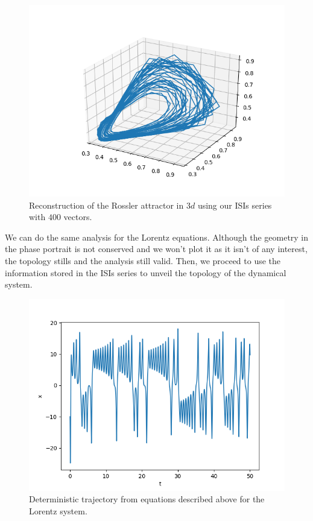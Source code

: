 \documentclass[10pt]{article}
\begin{document}
\begin{figure}[h!]
\centering
\includegraphics[scale=0.45]{rossler_atractor_400points}
\caption{Reconstruction of the Rossler attractor in $3d$ using our ISIs series with $400$ vectors.}
\label{fig:rossler_isi}
\end{figure}

We can do the same analysis for the Lorentz equations. Although the geometry in the phase portrait is not conserved and we won't plot it as it isn't of any interest, the topology stills and the analysis still valid. Then, we proceed to use the information stored in the ISIs series to unveil the topology of the dynamical system.

\begin{figure}[h!]
\centering
\includegraphics[scale=0.5]{real_trajectory_lorentz}
\caption{Deterministic trajectory from equations described above for the Lorentz system.}
\label{fig:lorentz_trajectory}
\end{figure}
\end{document}
